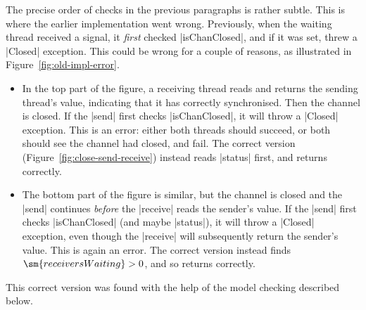 The precise order of checks in the previous paragraphs is rather subtle.  This
is where the earlier implementation went wrong.  Previously, when the waiting
thread received a signal, it \emph{first} checked |isChanClosed|, and if it
was set, threw a |Closed| exception.  This could be wrong for a couple of
reasons, as illustrated in Figure~\ref{fig:old-impl-error}.
%
\begin{itemize}
\item
In the top part of the figure, a receiving thread reads and returns the
sending thread's value, indicating that it has correctly synchronised.  Then
the channel is closed.  If the |send| first checks |isChanClosed|, it will
throw a |Closed| exception.  This is an error: either both threads should
succeed, or both should see the channel had closed, and fail.  The correct
version (Figure~\ref{fig:close-send-receive}) instead reads |status| first,
and returns correctly.

\item
The bottom part of the figure is similar, but the channel is closed and the
|send| continues \emph{before} the |receive| reads the sender's value.  If the
|send| first checks |isChanClosed| (and maybe |status|), it will throw a
|Closed| exception, even though the |receive| will subsequently return the
sender's value.  This is again an error.  The correct version instead finds
$\sm{receiversWaiting} > 0$, and so returns correctly.
\end{itemize}
This correct version was found with the help of the model checking described
below.



